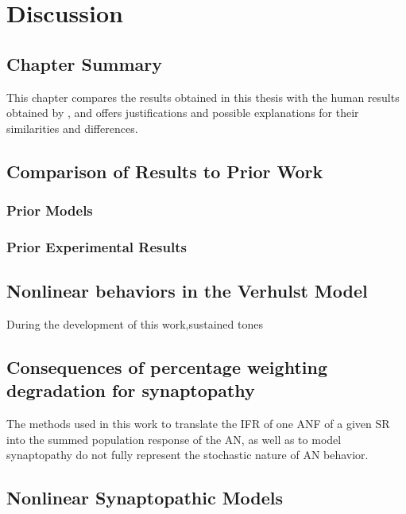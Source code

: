 \chapter{Discussion}
\label{chapter:Discussion}
\thispagestyle{myheadings}

\graphicspath{{6_Discussion/Figures/}}
\section{Chapter Summary} %
\label{sec:discussion_summary}
This chapter compares the results obtained in this thesis with the human results obtained by \citeauthor{Mehraei2016Auditory}, and offers justifications and possible explanations for their similarities and differences.

\section{Comparison of Results to Prior Work} %
\label{sec:comparison_of_results_to_prior_work}
\subsection{Prior Models} %
\label{sub:prior_models}

\subsection{Prior Experimental Results} %
\label{sub:prior_experimental_results}


\section{Nonlinear behaviors in the Verhulst Model} %
\label{sec:nonlinear_behaviors_in_the_verhulst_model}
During the development of this work,sustained tones 

\section{Consequences of percentage weighting degradation for synaptopathy} %
\label{sec:consequences_of_percentage_weighting_degradation_for_synaptopathy}
The methods used in this work to translate the IFR of one ANF of a given SR into the summed population response of the AN, as well as to model synaptopathy do not fully represent the stochastic nature of AN behavior. 

\section{Nonlinear Synaptopathic Models} %
\label{sec:nonlinear_synaptopathic_models}

